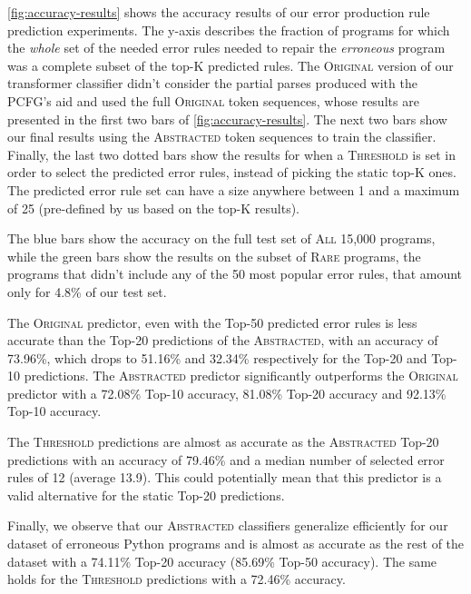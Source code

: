 %
\autoref{fig:accuracy-results} shows the accuracy results of our error
production rule prediction experiments. The y-axis describes the fraction of
programs for which the \emph{whole} set of the needed error rules needed to
repair the \emph{erroneous} program was a complete subset of the top-K predicted
rules.
%
The \textsc{Original} version of our transformer classifier didn't consider the
partial parses produced with the PCFG's aid and used the full \textsc{Original}
token sequences, whose results are presented in the first two bars of
\autoref{fig:accuracy-results}. The next two bars show our final results using
the \textsc{Abstracted} token sequences to train the classifier. Finally, the
last two dotted bars show the results for when a \textsc{Threshold} is set in
order to select the predicted error rules, instead of picking the static top-K
ones. The predicted error rule set can have a size anywhere between 1 and a
maximum of 25 (pre-defined by us based on the top-K results).

The blue bars show the accuracy on the full test set of \textsc{All} 15,000
programs, while the green bars show the results on the subset of \textsc{Rare}
programs, \ie the programs that didn't include any of the 50 most popular error
rules, that amount only for 4.8\% of our test set.

The \textsc{Original} predictor, even with the Top-50 predicted error rules is
less accurate than the Top-20 predictions of the \textsc{Abstracted}, with an
accuracy of 73.96\%, which drops to 51.16\% and 32.34\% respectively for the
Top-20 and Top-10 predictions. The \textsc{Abstracted} predictor significantly
outperforms the \textsc{Original} predictor with a 72.08\% Top-10 accuracy,
81.08\% Top-20 accuracy and 92.13\% Top-10 accuracy.

The \textsc{Threshold} predictions are almost as accurate as the
\textsc{Abstracted} Top-20 predictions with an accuracy of 79.46\% and a median
number of selected error rules of 12 (average 13.9). This could potentially mean
that this predictor is a valid alternative for the static Top-20 predictions.

Finally, we observe that our \textsc{Abstracted} classifiers generalize
efficiently for our dataset of erroneous Python programs and is almost as
accurate as the rest of the dataset with a 74.11\% Top-20 accuracy (85.69\%
Top-50 accuracy). The same holds for the \textsc{Threshold} predictions with a
72.46\% accuracy.

